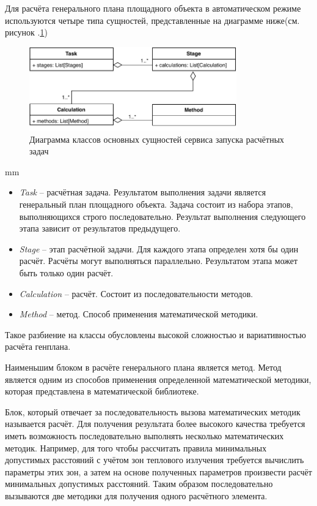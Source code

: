 Для расчёта генерального плана площадного объекта в автоматическом режиме используются четыре типа сущностей,
представленные на диаграмме ниже(см. рисунок .\ref{pic:architecture__orchestrator-classes})

\begin{figure}[H]
	\includegraphics[width=0.8\textwidth]{architecture/pictures/orchestrator/classes}
	\caption{Диаграмма классов основных сущностей сервиса запуска расчётных задач}
	\label{pic:architecture__orchestrator-classes}
\end{figure}
 mm

\begin{itemize}
	\item {
		\textit{Task} -- расчётная задача.
		Результатом выполнения задачи является генеральный план площадного объекта.
		Задача состоит из набора этапов, выполняющихся строго последовательно.
		Результат выполнения следующего этапа зависит от результатов предыдущего.
	}
	\item {
		\textit{Stage} -- этап расчётной задачи.
		Для каждого этапа определен хотя бы один расчёт.
		Расчёты могут выполняться параллельно.
		Результатом этапа может быть только один расчёт.
	}
	\item {
		\textit{Calculation} -- расчёт. Состоит из последовательности методов.
	}
	\item {
		\textit{Method} -- метод. Способ применения математической методики.
	}
\end{itemize}

Такое разбиение на классы обусловлены высокой сложностью и вариативностью расчёта генплана.

Наименьшим блоком в расчёте генерального плана является метод. Метод является одним из способов применения
определенной математической методики, которая представлена в математической библиотеке.

Блок, который отвечает за последовательность вызова математических методик называется расчёт.
Для получения результата более высокого качества требуется иметь возможность последовательно выполнять несколько
математических методик.
Например, для того чтобы рассчитать правила минимальных допустимых расстояний с учётом зон теплового излучения
требуется вычислить параметры этих зон, а затем на основе полученных параметров произвести расчёт минимальных
допустимых расстояний. Таким образом последовательно вызываются две методики для получения одного расчётного элемента.


